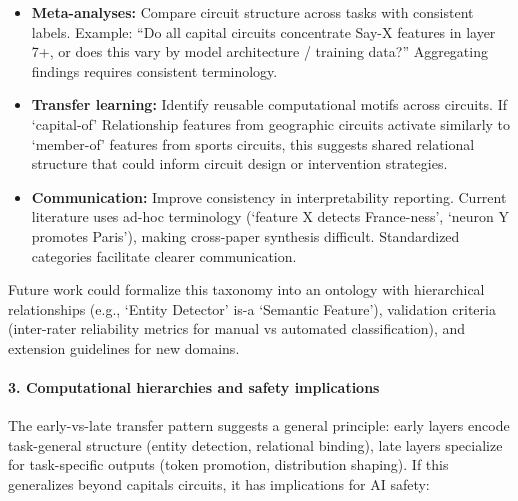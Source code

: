 \begin{itemize}
  \item \textbf{Meta-analyses:} Compare circuit structure across tasks with consistent labels. Example: ``Do all capital circuits concentrate Say-X features in layer 7+, or does this vary by model architecture / training data?'' Aggregating findings requires consistent terminology.
  
  \item \textbf{Transfer learning:} Identify reusable computational motifs across circuits. If `capital-of' Relationship features from geographic circuits activate similarly to `member-of' features from sports circuits, this suggests shared relational structure that could inform circuit design or intervention strategies.
  
  \item \textbf{Communication:} Improve consistency in interpretability reporting. Current literature uses ad-hoc terminology (`feature X detects France-ness', `neuron Y promotes Paris'), making cross-paper synthesis difficult. Standardized categories facilitate clearer communication.
\end{itemize}

Future work could formalize this taxonomy into an ontology with hierarchical relationships (e.g., `Entity Detector' is-a `Semantic Feature'), validation criteria (inter-rater reliability metrics for manual vs automated classification), and extension guidelines for new domains.

\paragraph{3. Computational hierarchies and safety implications}
The early-vs-late transfer pattern suggests a general principle: early layers encode task-general structure (entity detection, relational binding), late layers specialize for task-specific outputs (token promotion, distribution shaping). If this generalizes beyond capitals circuits, it has implications for AI safety:

